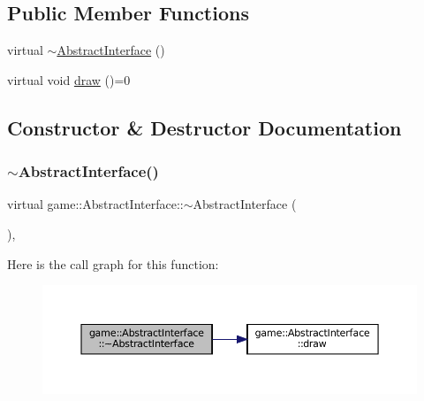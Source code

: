 \subsection*{Public Member Functions}
\begin{DoxyCompactItemize}
\item 
virtual \hyperlink{classgame_1_1_abstract_interface_a29480586421a44d384932f48aa05f97f}{$\sim$\+Abstract\+Interface} ()
\item 
virtual void \hyperlink{classgame_1_1_abstract_interface_af4330557019768a4be424165e4cf008f}{draw} ()=0
\end{DoxyCompactItemize}


\subsection{Constructor \& Destructor Documentation}
\mbox{\label{classgame_1_1_abstract_interface_a29480586421a44d384932f48aa05f97f}} 
\subsubsection{\texorpdfstring{$\sim$\+Abstract\+Interface()}{~AbstractInterface()}}
{\footnotesize\ttfamily virtual game\+::\+Abstract\+Interface\+::$\sim$\+Abstract\+Interface (\begin{DoxyParamCaption}{ }\end{DoxyParamCaption})\hspace{0.3cm}{\ttfamily [inline]}, {\ttfamily [virtual]}}

Here is the call graph for this function\+:
\nopagebreak
\begin{figure}[H]
\begin{center}
\leavevmode
\includegraphics[width=350pt]{classgame_1_1_abstract_interface_a29480586421a44d384932f48aa05f97f_cgraph}
\end{center}
\end{figure}


